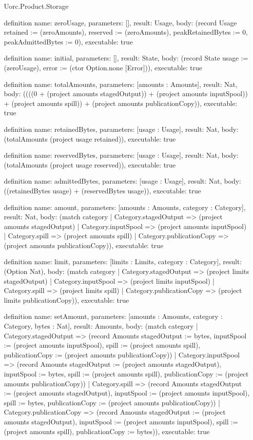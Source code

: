 \begin{lexlean}{Uorc.Product.Storage}
\begin{semanticmodule}
definition{
  name: zeroUsage,
  parameters: [],
  result: Usage,
  body: (record Usage {retained := (zeroAmounts), reserved := (zeroAmounts), peakRetainedBytes := 0, peakAdmittedBytes := 0}),
  executable: true
}

definition{
  name: initial,
  parameters: [],
  result: State,
  body: (record State {usage := (zeroUsage), error := (ctor Option.none [Error])}),
  executable: true
}

definition{
  name: totalAmounts,
  parameters: [amounts : Amounts],
  result: Nat,
  body: ((((0 + (project amounts stagedOutput)) + (project amounts inputSpool)) + (project amounts spill)) + (project amounts publicationCopy)),
  executable: true
}

definition{
  name: retainedBytes,
  parameters: [usage : Usage],
  result: Nat,
  body: (totalAmounts (project usage retained)),
  executable: true
}

definition{
  name: reservedBytes,
  parameters: [usage : Usage],
  result: Nat,
  body: (totalAmounts (project usage reserved)),
  executable: true
}

definition{
  name: admittedBytes,
  parameters: [usage : Usage],
  result: Nat,
  body: ((retainedBytes usage) + (reservedBytes usage)),
  executable: true
}

definition{
  name: amount,
  parameters: [amounts : Amounts, category : Category],
  result: Nat,
  body: (match category
    | Category.stagedOutput => (project amounts stagedOutput)
    | Category.inputSpool => (project amounts inputSpool)
    | Category.spill => (project amounts spill)
    | Category.publicationCopy => (project amounts publicationCopy)),
  executable: true
}

definition{
  name: limit,
  parameters: [limits : Limits, category : Category],
  result: (Option Nat),
  body: (match category
    | Category.stagedOutput => (project limits stagedOutput)
    | Category.inputSpool => (project limits inputSpool)
    | Category.spill => (project limits spill)
    | Category.publicationCopy => (project limits publicationCopy)),
  executable: true
}

definition{
  name: setAmount,
  parameters: [amounts : Amounts, category : Category, bytes : Nat],
  result: Amounts,
  body: (match category
    | Category.stagedOutput => (record Amounts {stagedOutput := bytes, inputSpool := (project amounts inputSpool), spill := (project amounts spill), publicationCopy := (project amounts publicationCopy)})
    | Category.inputSpool => (record Amounts {stagedOutput := (project amounts stagedOutput), inputSpool := bytes, spill := (project amounts spill), publicationCopy := (project amounts publicationCopy)})
    | Category.spill => (record Amounts {stagedOutput := (project amounts stagedOutput), inputSpool := (project amounts inputSpool), spill := bytes, publicationCopy := (project amounts publicationCopy)})
    | Category.publicationCopy => (record Amounts {stagedOutput := (project amounts stagedOutput), inputSpool := (project amounts inputSpool), spill := (project amounts spill), publicationCopy := bytes})),
  executable: true
}


\end{semanticmodule}
\end{lexlean}
